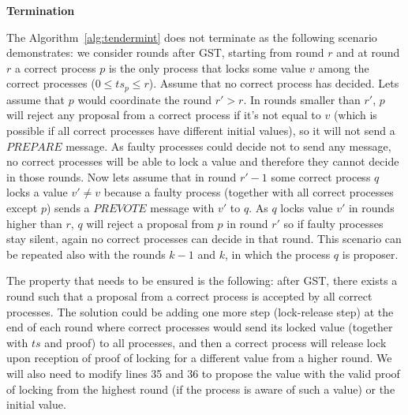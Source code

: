 \textbf{Termination} 

The Algorithm~\ref{alg:tendermint} does not terminate as the following scenario demonstrates: we consider rounds after GST, starting from round $r$ and at round $r$ a correct process $p$ is the only process that locks some value $v$ among the correct processes ($0 \le ts_p \le r$). Assume that no correct process has decided. Lets assume that $p$ would coordinate the round $r'>r$. In rounds smaller than $r'$, $p$ will reject any proposal from a correct process if it's not equal to $v$ (which is possible if all correct processes have different initial values), so it will not send a $PREPARE$ message. As faulty processes could decide not to send any message, no correct processes will be able to lock a value and therefore they cannot decide in those rounds. Now lets assume that in round $r'-1$ some correct process $q$ locks a value $v' \neq v$ because a faulty process (together with all correct processes except $p$) sends a $PREVOTE$ message with $v'$ to $q$. As $q$ locks value $v'$ in rounds higher than $r$, $q$ will reject a proposal from $p$ in round $r'$ so if faulty processes stay silent, again no correct processes can decide in that round. This scenario can be repeated also with the rounds $k-1$ and $k$, in which the process $q$ is proposer.

The property that needs to be ensured is the following: after GST, there exists a round such that a proposal from a correct process is accepted by all correct processes. The solution could be adding one more step (lock-release step) at the end of each round where correct processes would send its locked value (together with $ts$ and proof) to all processes, and then a correct process will release lock upon reception of proof of locking for a different value from a higher round. We will also need to modify lines 35 and 36 to propose the value with the valid proof of locking from the highest round (if the process is aware of such a value) or the initial value.

            


